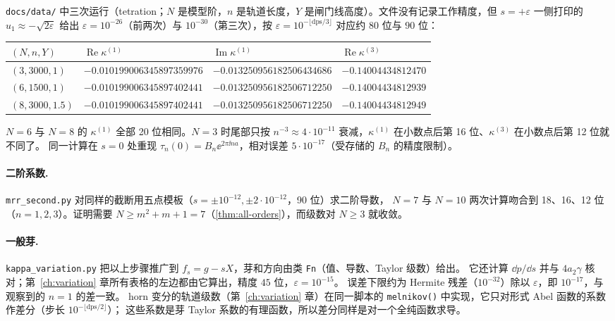 \begin{example}[截断阶的影响]\label{ch11:ex:mrr}
\texttt{docs/data/} 中三次运行（tetration；$N$ 是模型阶，$n$ 是轨道长度，$Y$ 是闸门线高度）。文件没有记录工作精度，但 $s=+\varepsilon$ 一侧打印的
$u_1\approx-\sqrt{2\varepsilon}$ 给出 $\varepsilon=10^{-26}$（前两次）与 $10^{-30}$（第三次），按 $\varepsilon=10^{-\lfloor\mathrm{dps}/3\rfloor}$ 对应约 $80$ 位与 $90$ 位：
\begin{center}\small
\begin{tabular}{llll}
\toprule
$(N,n,Y)$ & $\operatorname{Re}\kappa^{(1)}$ & $\operatorname{Im}\kappa^{(1)}$ & $\operatorname{Re}\kappa^{(3)}$\\
\midrule
$(3,3000,1)$ & $-0.010199006345897359976$ & $-0.013250956182506434686$ & $-0.14004434812470$\\
$(6,1500,1)$ & $-0.010199006345897402441$ & $-0.013250956182506712250$ & $-0.14004434812939$\\
$(8,3000,1.5)$ & $-0.010199006345897402441$ & $-0.013250956182506712250$ & $-0.14004434812949$\\
\bottomrule
\end{tabular}
\end{center}
$N=6$ 与 $N=8$ 的 $\kappa^{(1)}$ 全部 20 位相同。$N=3$ 时尾部只按 $n^{-3}\approx4\cdot10^{-11}$ 衰减，$\kappa^{(1)}$ 在小数点后第 16 位、$\kappa^{(3)}$ 在小数点后第 12 位就不同了。
同一计算在 $s=0$ 处重现 $\tau_n(0)=B_n\ee^{2\pi\ii na}$，相对误差 $5\cdot10^{-17}$（受存储的 $B_n$ 的精度限制）。
\end{example}

\paragraph{二阶系数.} \texttt{mrr\_\allowbreak{}second.py} 对同样的截断用五点模板（$s=\pm10^{-12},\pm2\cdot10^{-12}$，90 位）求二阶导数，
$N=7$ 与 $N=10$ 两次计算吻合到 18、16、12 位（$n=1,2,3$）。证明需要 $N\ge m^2+m+1=7$（\cref{thm:all-orders}），而级数对 $N\ge3$ 就收敛。

\paragraph{一般芽.} \texttt{kappa\_\allowbreak{}variation.py} 把以上步骤推广到 $f_s=g-sX$，芽和方向由类 \texttt{Fn}（值、导数、Taylor 级数）给出。
它还计算 $\dd p/\dd s$ 并与 $4a_2\gamma$ 核对；第~\ref{ch:variation} 章所有表格的左边都由它算出，精度 $45$ 位，$\varepsilon=10^{-15}$。
误差下限约为 Hermite 残差（$10^{-32}$）除以 $\varepsilon$，即 $10^{-17}$，与观察到的 $n=1$ 的差一致。
horn 变分的轨道级数（第~\ref{ch:variation} 章）在同一脚本的 \texttt{melnikov()} 中实现，它只对形式 Abel 函数的系数作差分（步长 $10^{-\lfloor\mathrm{dps}/2\rfloor}$）；
这些系数是芽 Taylor 系数的有理函数，所以差分同样是对一个全纯函数求导。

